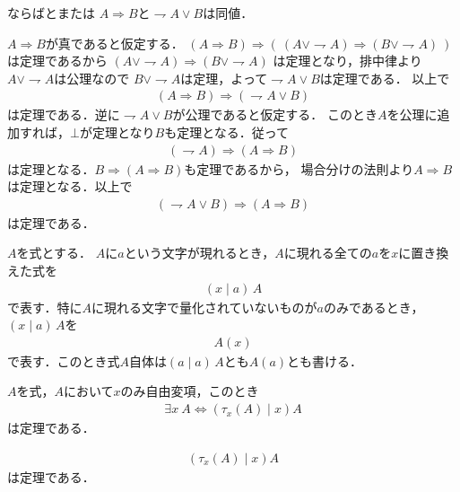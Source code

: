 	\begin{itembox}[l]{ならばとまたは}
		$A \Longrightarrow B$と$\rightharpoondown A \vee B$は同値．
	\end{itembox}
	
	\begin{prf}
		$A \Longrightarrow B$が真であると仮定する．
		$(A \Longrightarrow B) \Longrightarrow (\ (A \vee \rightharpoondown A) \Longrightarrow (B \vee \rightharpoondown A)\ )$は定理であるから
		$(A \vee \rightharpoondown A) \Longrightarrow (B \vee \rightharpoondown A)$
		は定理となり，排中律より$A \vee \rightharpoondown A$は公理なので
		$B \vee \rightharpoondown A$は定理，よって$\rightharpoondown A \vee B$は定理である．
		以上で
		\begin{align}
			(A \Longrightarrow B) \Longrightarrow (\rightharpoondown A \vee B)
		\end{align}
		は定理である．逆に$\rightharpoondown A \vee B$が公理であると仮定する．
		このとき$A$を公理に追加すれば，$\bot$が定理となり$B$も定理となる．従って
		\begin{align}
			(\rightharpoondown A) \Longrightarrow (A \Longrightarrow B)
		\end{align}
		は定理となる．$B \Longrightarrow (A \Longrightarrow B)$も定理であるから，
		場合分けの法則より$A \Longrightarrow B$は定理となる．以上で
		\begin{align}
			(\rightharpoondown A \vee B) \Longrightarrow (A \Longrightarrow B)
		\end{align}
		は定理である．
	\end{prf}
	
	$A$を式とする．
	$A$に$a$という文字が現れるとき，$A$に現れる全ての$a$を$x$に置き換えた式を
	\begin{align}
		(x \mid a)\, A
	\end{align}
	で表す．特に$A$に現れる文字で量化されていないものが$a$のみであるとき，
	$(x \mid a)\, A$を
	\begin{align}
		A(x)
	\end{align}
	で表す．このとき式$A$自体は$(a \mid a)\, A$とも$A(a)$とも書ける．
	
	
	\begin{screen}
		$A$を式，$A$において$x$のみ自由変項，このとき
		\begin{align}
			\exists x\ A \Longleftrightarrow \left( \tau_x(A) \mid x \right) A
		\end{align}
		は定理である．
	\end{screen}
	
	\begin{screen}
		\begin{align}
			\left( \tau_x(A) \mid x \right) A
		\end{align}
		は定理である．
	\end{screen}